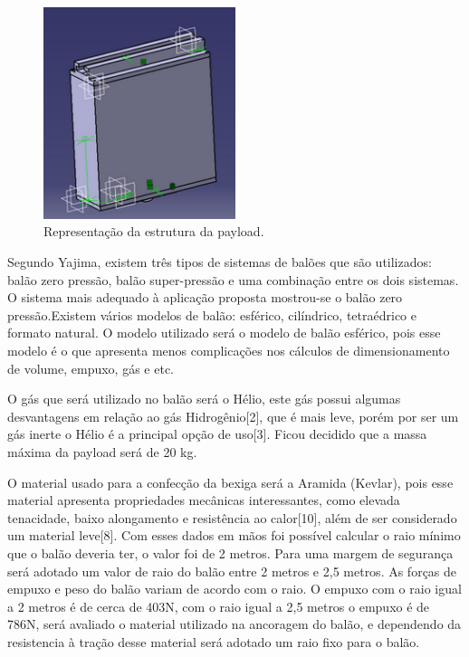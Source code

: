   \begin{figure}[H]
    \centering
    \includegraphics[width=0.5\textwidth]{figuras/payload}
    \caption{Representação da estrutura da payload. }
    \label{img:payload}
  \end{figure}


    Segundo Yajima, existem três tipos de sistemas de balões que são utilizados: balão zero pressão, balão super-pressão e uma combinação entre os dois sistemas. O sistema mais adequado à aplicação proposta mostrou-se o balão zero pressão.Existem vários modelos de balão: esférico, cilíndrico, tetraédrico e formato natural. O modelo utilizado será o modelo de balão esférico, pois esse modelo é o que apresenta menos complicações nos cálculos de dimensionamento de volume, empuxo, gás e etc.

    O gás que será utilizado no balão será o Hélio, este gás possui algumas desvantagens em relação ao gás Hidrogênio[2], que é mais leve, porém por ser um gás inerte o Hélio é a principal opção  de uso[3]. Ficou decidido que a massa  máxima  da payload será de 20 kg.

    O material usado para a confecção da bexiga será a Aramida (Kevlar), pois  esse material apresenta propriedades mecânicas interessantes, como elevada tenacidade, baixo alongamento e resistência ao calor[10],  além de ser considerado um material leve[8]. Com esses dados em mãos foi possível calcular o raio mínimo que o balão deveria ter, o valor foi de 2 metros. Para uma margem de segurança será adotado um valor de raio do balão entre 2 metros e 2,5 metros. As forças de empuxo e peso do balão variam de acordo com o raio. O empuxo com o raio igual a 2 metros é de cerca de 403N, com o raio igual a 2,5 metros o empuxo é de 786N, será avaliado o material utilizado na ancoragem do balão,  e dependendo da resistencia à tração desse material será adotado um raio fixo para o balão.

